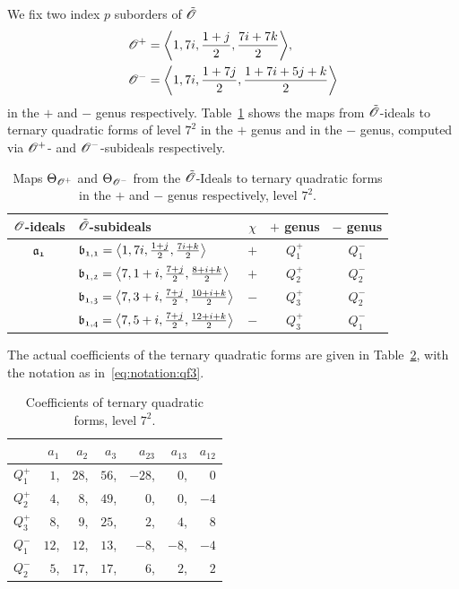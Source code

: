 We fix two index $p$ suborders of ${\tilde{{\mathscr{O}}}}$
\begin{align*}
  \Ops & = \<1,7i,\frac{1+j}{2},\frac{7i+7k}{2}>, \\
  \Ons & = \<1,7i,\frac{1+7j}{2},\frac{1+7i+5j+k}{2}>
\end{align*}
in the $+$ and $-$ genus respectively.
Table~\ref{table:psi:7} shows the maps from ${\tilde{{\mathscr{O}}}}$-ideals
to ternary quadratic forms of level $7^2$ in the $+$ genus
and in the $-$ genus, computed via ${{\mathscr{O}}^+}$- and ${{\mathscr{O}}^-}$-subideals respectively.
\begin{table}
\begin{tabular}{|c|l|c|c|c|}
\hline
${\mathscr{O}}$-ideals & ${\tilde{{\mathscr{O}}}}$-subideals & $\chi$ & $+$ genus & $-$ genus \\
\hline\hline
${\mathfrak{a_{1}}}$ & $\id{b_{1,1}}=\<1,7i,\frac{1+j}{2},\frac{7i+k}{2}>$ & $+$ & $Q_{1}^{+}$ & $Q_{1}^{-}$\\
 & $\id{b_{1,2}}=\<7,1+i,\frac{7+j}{2},\frac{8+i+k}{2}>$ & $+$ & $Q_{2}^{+}$ & $Q_{2}^{-}$\\
 & $\id{b_{1,3}}=\<7,3+i,\frac{7+j}{2},\frac{10+i+k}{2}>$ & $-$ & $Q_{3}^{+}$ & $Q_{2}^{-}$\\
 & $\id{b_{1,4}}=\<7,5+i,\frac{7+j}{2},\frac{12+i+k}{2}>$ & $-$ & $Q_{3}^{+}$ & $Q_{1}^{-}$\\
\hline
\end{tabular}
\caption{Maps ${\Theta}_{{{\mathscr{O}}^+}}$ and ${\Theta}_{{{\mathscr{O}}^-}}$ from the ${\tilde{{\mathscr{O}}}}$-Ideals
to ternary quadratic forms in the $+$ and $-$ genus respectively, level $7^2$.
          \label{table:psi:7}}
\end{table}
The actual coefficients of the ternary quadratic forms are given in
Table~\ref{table:qf3:7}, with the notation
as in~\eqref{eq:notation:qf3}.
\begin{table}
\begin{tabular}{|l|rrrrrr|}
\hline
 & $a_1$ & $a_2$ & $a_3$ & $a_{23}$ & $a_{13}$ & $a_{12}$ \\
\hline\hline
$Q_{1}^{+}$ & $1$,&$28$,&$56$,&$-28$,&$0$,&$0$ \\
$Q_{2}^{+}$ & $4$,&$8$,&$49$,&$0$,&$0$,&$-4$ \\
$Q_{3}^{+}$ & $8$,&$9$,&$25$,&$2$,&$4$,&$8$ \\
\hline
$Q_{1}^{-}$ & $12$,&$12$,&$13$,&$-8$,&$-8$,&$-4$ \\
$Q_{2}^{-}$ & $5$,&$17$,&$17$,&$6$,&$2$,&$2$ \\
\hline
\end{tabular}
\caption{Coefficients of ternary quadratic forms, level $7^2$.
          \label{table:qf3:7}}
\end{table}
